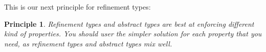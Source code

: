 \documentclass[sigconf, anonymous, review]{acmart}
\newcommand{\tc}[1]{{\small\texttt{#1}}}
\newtheorem{principle}{Principle}
\begin{document}
This is our next principle for refinement types:
\begin{principle}
  Refinement types and abstract types are best at enforcing different kind of
  properties. You should user the simpler solution for each property that you
  need, as refinement types and abstract types mix well.
\end{principle}






\end{document}
